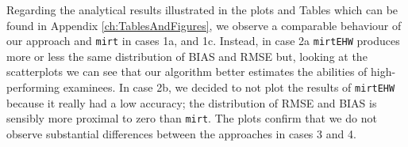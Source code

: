 Regarding the analytical results illustrated in the plots and Tables which can be found in Appendix \ref{ch:TablesAndFigures}, we observe a comparable behaviour of our approach and  \texttt{mirt} in cases 1a, and 1c. Instead, in case 2a \texttt{mirt\tiny{EHW}} produces more or less the same distribution of BIAS and RMSE but, looking at the scatterplots we can see that our algorithm better estimates the abilities of high-performing examinees. In case 2b, we decided to not plot the results of \texttt{mirt\tiny{EHW}} because it really had a low accuracy; the distribution of RMSE and BIAS is sensibly more proximal to zero than \texttt{mirt}. 
The plots confirm that we do not observe substantial differences between the approaches in cases 3 and 4.
\begin{table}[H]
	\centering
	\caption{RMSEs averaged across the item pool ($\hat{a}$ and $\hat{b}$) and test-takers ($\hat{\theta}$) \label{tab:RMSE}}
\end{table}

